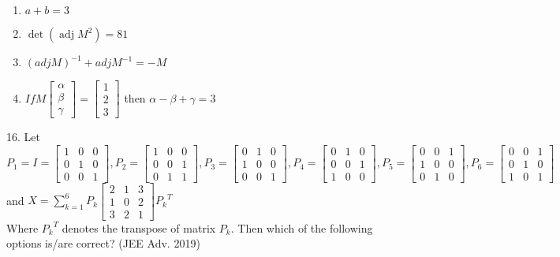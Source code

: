\documentclass[journal,12pt,twocolumn]{IEEEtran}
\theoremstyle{remark}
\begin{document}
\begin{enumerate}
    \item $a+b=3$
    \item $\mathop{det}(\mathop{adj}M^2)=81$
    \item $(adjM)^{-1}+adjM^{-1}=-M$
    \item $If M\begin{bmatrix}
        \alpha\\
        \beta\\
        \gamma
    \end{bmatrix} = \begin{bmatrix}
        1\\
        2\\
        3
    \end{bmatrix}$ then $\alpha-\beta+\gamma=3$\\[2pt]
\end{enumerate}

16. Let\\
$
P_1=I=\begin{bmatrix}
    1 & 0 & 0\\
    0 & 1 & 0\\
    0 & 0 & 1
\end{bmatrix}, P_2 = \begin{bmatrix}
    1 & 0 & 0\\
    0 & 0 & 1\\
    0 & 1 & 1
\end{bmatrix}, P_3 = \begin{bmatrix}
    0 & 1 & 0\\
    1 & 0 & 0\\
    0 & 0 & 1
\end{bmatrix}, P_4 = \begin{bmatrix}
    0 & 1 & 0\\
    0 & 0 & 1\\
    1 & 0 & 0
\end{bmatrix}, P_5 = \begin{bmatrix}
    0 & 0 & 1\\
    1 & 0 & 0\\
    0 & 1 & 0
\end{bmatrix}, P_6 = \begin{bmatrix}
    0 & 0 & 1\\
    0 & 1 & 0\\
    1 & 0 & 1
\end{bmatrix}
$\\ and $\displaystyle X = \sum_{k=1}^{6}P_k\begin{bmatrix}
    2 & 1 & 3\\
    1 & 0 & 2\\
    3 & 2 & 1
\end{bmatrix}{P_k}^T$\\Where ${P_k}^T$ denotes the transpose of matrix $P_k$. Then which of the following options is/are correct? \hfill (JEE Adv. 2019)
\end{document}
